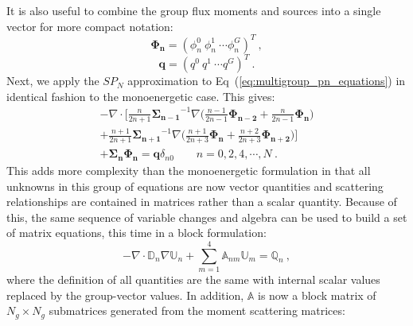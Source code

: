 \documentclass[letterpaper,12pt]{article}
\begin{document}
It is also useful to combine the group flux moments and sources into a
single vector for more compact notation:
\begin{equation}
  \mathbf{\Phi_n} = (\phi^0_n\ \phi^1_n\ \cdots \phi^G_n )^T\:, 
  \label{eq:group_flux_vector}
\end{equation}
\begin{equation}
  \mathbf{q} = (q^0\ q^1\ \cdots q^G )^T\:.
  \label{eq:group_source_vector}
\end{equation}
Next, we apply the $SP_N$ approximation to
Eq~(\ref{eq:multigroup_pn_equations}) in identical fashion to the
monoenergetic case. This gives:
\begin{multline}
  -\nabla \cdot \Bigg[\frac{n}{2n+1}\mathbf{\Sigma_{n-1}}^{-1} \nabla
    \Big(\frac{n-1}{2n-1} \mathbf{\Phi_{n-2}} +
    \frac{n}{2n-1}\mathbf{\Phi_n} \Big) \\+
    \frac{n+1}{2n+1}\mathbf{\Sigma_{n+1}}^{-1} \nabla
    \Big(\frac{n+1}{2n+3}\mathbf{\Phi_n} +
    \frac{n+2}{2n+3}\mathbf{\Phi_{n+2}}\Big) \Bigg] \\+
  \mathbf{\Sigma_n} \mathbf{\Phi_n} = \mathbf{q}
  \delta_{n0}\ \ \ \ \ \ \ \ \ n = 0,2,4,\cdots,N\:.
  \label{eq:multigroup_spn_equations}
\end{multline}
This adds more complexity than the monoenergetic formulation in that
all unknowns in this group of equations are now vector quantities and
scattering relationships are contained in matrices rather than a
scalar quantity. Because of this, the same sequence of variable
changes and algebra can be used to build a set of matrix equations,
this time in a block formulation:
\begin{equation}
  -\nabla \cdot \mathbb{D}_n \nabla \mathbb{U}_n + \sum_{m=1}^4
  \mathbb{A}_{nm} \mathbb{U}_m = \mathbb{Q}_n\:,
  \label{eq:spn_multigroup_system}
\end{equation}
where the definition of all quantities are the same with internal
scalar values replaced by the group-vector values. In addition,
$\mathbb{A}$ is now a block matrix of $N_g \times N_g$ submatrices
generated from the moment scattering matrices:
\end{document}

